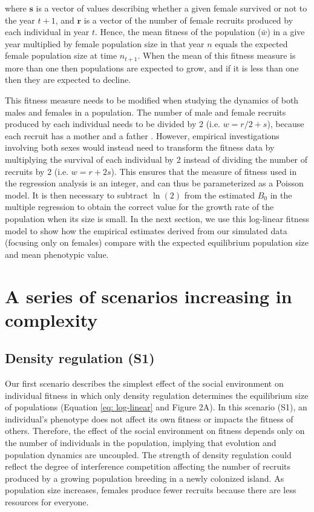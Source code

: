 \documentclass{article}
\begin{document}
	\noindent where $\bm{s}$ is a vector of values describing whether a given female survived or not to the year $t+1$, and $\bm{r}$ is a vector of the number of female recruits produced by each individual in year ${t}$. Hence, the mean fitness of the population ($\bar{w}$) in a give year multiplied by female population size in that year $n$ equals the expected female population size at time $n_{t + 1}$. When the mean of this fitness measure is more than one then populations are expected to grow, and if it is less than one then they are expected to decline.
	
	This fitness measure needs to be modified when studying the dynamics of both males and females in a population. The number of male and female recruits produced by each individual needs to be divided by 2 (i.e. $w= r/2 + s$), because each recruit has a mother and a father \citep{Saether2015}. However, empirical investigations involving both sexes would instead need to transform the fitness data by multiplying the survival of each individual by 2 instead of dividing the number of recruits by 2 (i.e. $w = r + 2s$). This ensures that the measure of fitness used in the regression analysis is an integer, and can thus be parameterized as a Poisson model. It is then necessary to subtract $\ln(2)$ from the estimated $B_0$ in the multiple regression to obtain the correct value for the growth rate of the population when its size is small. In the next section, we use this log-linear fitness model to show how the empirical estimates derived from our simulated data (focusing only on females) compare with the expected equilibrium population size and mean phenotypic value.
	
	\section{A series of scenarios increasing in complexity}
	\subsection{Density regulation (S1)}
	Our first scenario describes the simplest effect of the social environment on individual fitness \citep{Brook2006} in which only density regulation determines the equilibrium size of populations (Equation \autoref{eq: log-linear} and Figure 2A). In this scenario (S1), an individual's phenotype does not affect its own fitness or impacts the fitness of others. Therefore, the effect of the social environment on fitness depends only on the number of individuals in the population, implying that evolution and population dynamics are uncoupled. The strength of density regulation could reflect the degree of interference competition affecting the number of recruits produced by a growing population breeding in a newly colonized island. As population size increases, females produce fewer recruits because there are less resources for everyone. 
	
\end{document}
